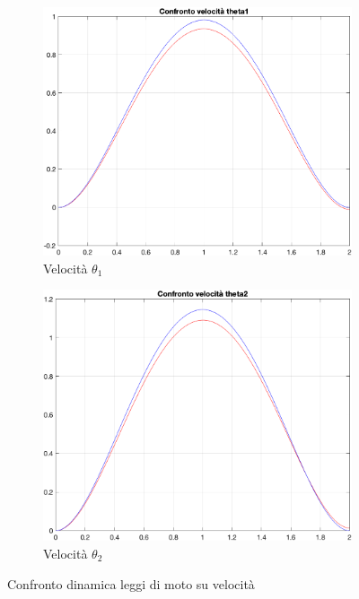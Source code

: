 \begin{figure}[!ht]
\begin{subfigure}{.45\textwidth}
  \centering
  \includegraphics[width=.78\linewidth]{Immagini/Dinamica/confrvelt1.png}  
  \caption{Velocità $\theta_1$}
  \label{fig:sub-firstv}
\end{subfigure}
\begin{subfigure}{.45\textwidth}
  \centering
  \includegraphics[width=.78\linewidth]{Immagini/Dinamica/confrtvelt2.png}  
  \caption{Velocità $\theta_2$}
  \label{fig:sub-secondv}
\end{subfigure}
\caption{Confronto dinamica leggi di moto su velocità}
\end{figure}
